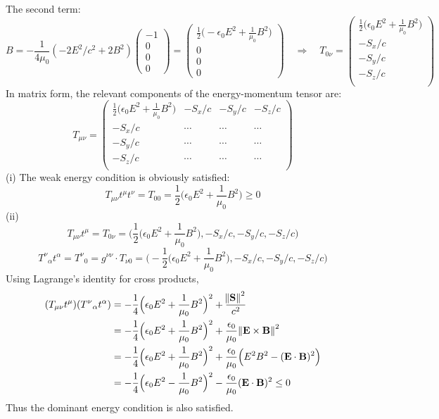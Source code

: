 \documentclass{article}
\begin{document}
The second term:
\[
B = -\frac{1}{4\mu_0} (-2E^2/c^2 + 2B^2)\begin{pmatrix}
	-1\\ 0 \\ 0\\ 0
\end{pmatrix} = \begin{pmatrix}
	  \frac{1}{2}\Big(-\epsilon_0E^2 + \frac{1}{\mu_0}B^2 \Big)\\ 0 \\0 \\ 0
	\end{pmatrix}
\quad\Rightarrow\quad T_{0\nu} = \begin{pmatrix}
		\frac{1}{2} \Big(\epsilon_0 E^2 + \frac{1}{\mu_0}B^2 \Big) \\
		-S_x/c \\
		-S_y/c \\
		-S_z/c \\
	\end{pmatrix}
 \]
In matrix form, the relevant components of the energy-momentum tensor are:
\[
	T_{\mu\nu} = \begin{pmatrix}
		\frac{1}{2}\Big(\epsilon_0E^2 + \frac{1}{\mu_0}B^2\Big) & -S_x/c & -S_y/c & -S_z/c\\
		-S_x/c & \cdots & \cdots & \cdots \\
		-S_y/c & \cdots & \cdots & \cdots \\
		-S_z/c & \cdots & \cdots & \cdots \\
	\end{pmatrix}
\]
(i)
The weak energy condition is obviously satisfied:
\[ T_{\mu\nu}t^\mu t^\nu = T_{00} = \frac{1}{2}\Big(\epsilon_0E^2 + \frac{1}{\mu_0}B^2\Big) \geq 0 \]
(ii)
\[ T_{\mu\nu}t^\mu = T_{0\nu} = \Bigg(\frac{1}{2}\Big(\epsilon_0E^2 + \frac{1}{\mu_0}B^2\Big), -S_x/c, -S_y/c, -S_z/c\Bigg)\]
\[ T^\nu{}_{\alpha}t^\alpha = T^\nu{}_{0} = g^{\nu\nu} \cdot T_{\nu0} =  \Bigg(-\frac{1}{2}\Big(\epsilon_0E^2 + \frac{1}{\mu_0}B^2\Big), -S_x/c, -S_y/c, -S_z/c\Bigg)\]
Using Lagrange's identity for cross products,
\begin{align*}
(T_{\mu\nu}t^\mu) (T^\nu{}_{\alpha}t^\alpha) &=  -\frac{1}{4}\Big(\epsilon_0E^2 + \frac{1}{\mu_0}B^2\Big)^2 + \frac{\norm{\mathbf{S}}^2}{c^2} \\
&=  -\frac{1}{4}\Big(\epsilon_0E^2 + \frac{1}{\mu_0}B^2\Big)^2 + \frac{\epsilon_0}{\mu_0} \norm{\mathbf{E}\times\mathbf{B}}^2 \\
&=  -\frac{1}{4}\Big(\epsilon_0E^2 + \frac{1}{\mu_0}B^2\Big)^2 + \frac{\epsilon_0}{\mu_0} \Big(E^2B^2 - (\mathbf{E}\cdot\mathbf{B})^2\Big) \\
&= -\frac{1}{4}\Big(\epsilon_0E^2 - \frac{1}{\mu_0}B^2\Big)^2 - \frac{\epsilon_0}{\mu_0}(\mathbf{E}\cdot\mathbf{B})^2
\leq 0
\end{align*}
Thus the dominant energy condition is also satisfied.
\end{document}
